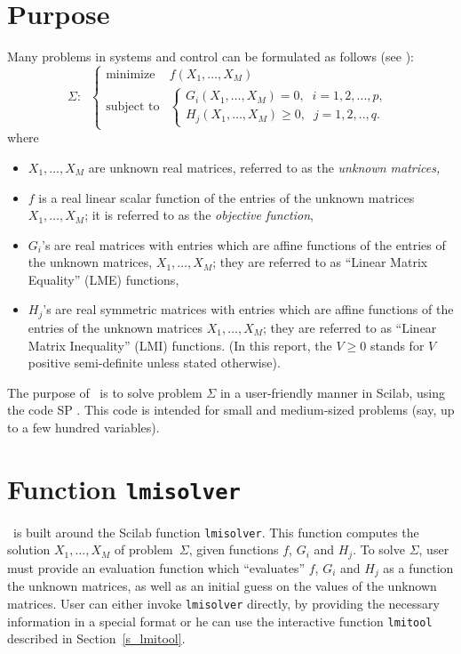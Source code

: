 \documentclass{article}
\begin{document}
\section{Purpose}
Many problems in systems and control can be formulated as follows 
(see \cite{BEFB:94}): 
\[
\Sigma : \;\; \left\{
\begin{array}{ll}
\mbox{minimize}    &  f(X_1,\ldots,X_M) \\
\mbox{subject to}  & \left\{ \begin{array}{l}
               G_i(X_1,\ldots,X_M) = 0, \;\;i=1,2,...,p,\\
                H_j(X_1,\ldots,X_M) \geq 0, \;\;j=1,2,..,q. 
                              \end{array} \right.
\end{array}
\right.
\]
where 
\begin{itemize}
\item
$X_1,\ldots,X_M$ are unknown real matrices, referred to as the {\em
unknown matrices,} 
\item
$f$ is a real linear scalar function of the entries of the unknown
matrices $X_1,\ldots,X_M$; it is referred to as the {\em objective function},
\item
$G_i$'s are real matrices with entries which are affine functions of the 
entries of the unknown matrices, $X_1,\ldots,X_M$;
they are referred to as  ``Linear Matrix Equality'' (LME) functions, 
\item
$H_j$'s are real symmetric matrices with entries which are affine functions
of the entries of the unknown matrices $X_1,\ldots,X_M$; they are referred to as  
``Linear Matrix Inequality'' (LMI) functions.  (In this report, 
the  $V \geq 0$ stands for $V$ positive semi-definite unless stated otherwise).  
\end{itemize}
The purpose of \lmitool\ is to solve problem $\Sigma$ in a user-friendly manner
in Scilab, using the code SP \cite{sp}. This code is intended for
small and medium-sized problems (say, up to a few hundred variables).

\section{Function {\tt lmisolver}}

\lmitool\ is built around the Scilab function {\tt lmisolver}.  This
function computes the solution $X_1,\ldots,X_M$ of
problem~$\Sigma$, given functions $f$, $G_i$ and $H_j$. To solve
$\Sigma$, user must provide an evaluation function which 
``evaluates'' $f$, $G_i$ and $H_j$ as a function the unknown matrices,
as well as an initial guess on the values of the unknown matrices.  User can either 
invoke {\tt lmisolver} directly, by providing the necessary information in a
special format or he can use the interactive
function {\tt lmitool} described in Section~\ref{s_lmitool}.
\end{document}
